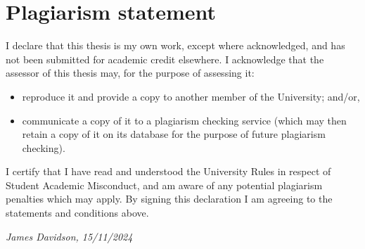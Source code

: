 \chapter*{Plagiarism statement}

I declare that this thesis is my own work, except where acknowledged,
and has not been submitted for academic credit elsewhere.
I acknowledge that the assessor of this thesis may, for the purpose
of assessing it:

\begin{itemize}
  \item reproduce it and provide a copy to another member of the
    University; and/or,
  \item communicate a copy of it to a plagiarism checking service
    (which may then retain a copy of it on its database for the
    purpose of future plagiarism checking).
\end{itemize}

I certify that I have read and understood the University Rules in
respect of Student Academic Misconduct, and am aware of any potential
plagiarism penalties which may apply.
By signing this declaration I am agreeing to the statements and
conditions above.

\hfill \emph{James Davidson, 15/11/2024}

